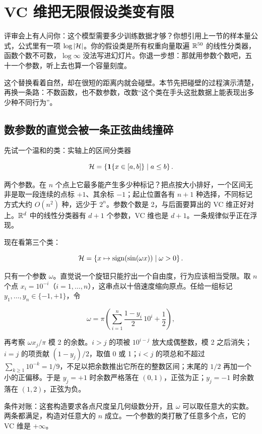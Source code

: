 \section{VC 维把无限假设类变有限}
\label{sec:13-Machine-Learning/10-Learning-Theory/03}

评审会上有人问你：这个模型需要多少训练数据才够？你想引用上一节的样本量公式，公式里有一项 \(\log\left|\mathcal{H}\right|\)。你的假设类是所有权重向量取遍 \(\mathbb{R}^{50}\) 的线性分类器，函数个数不可数，\(\log\infty\) 没法写进幻灯片。你退一步想：那就用参数个数吧，五十一个参数，听上去也算一个容量刻度。

这个替换看着自然，却在很短的距离内就会碰壁。本节先把碰壁的过程演示清楚，再换一条路：不数函数，也不数参数，改数``这个类在手头这批数据上能表现出多少种不同行为''。

\subsection{数参数的直觉会被一条正弦曲线撞碎}

先试一个温和的类：实轴上的区间分类器

\[
\mathcal{H}=\left\{\mathbf{1}\{x\in[a,b]\} \mid a\le b\right\}.
\]

两个参数。在 \(n\) 个点上它最多能产生多少种标记？把点按大小排好，一个区间无非是取一段连续的点标 \(+1\)、其余标 \(-1\)；起止位置各有 \(n+1\) 种选择，不同标记方式大约 \(O(n^2)\) 种，远少于 \(2^n\)。参数个数是 2，与后面要算出的 VC 维正好对上。\(\mathbb{R}^d\) 中的线性分类器有 \(d+1\) 个参数，VC 维也是 \(d+1\)。一条规律似乎正在浮现。

现在看第三个类：

\[
\mathcal{H}=\left\{x\mapsto \operatorname{sign}(\sin(\omega x)) \mid \omega>0\right\}.
\]

只有一个参数 \(\omega\)。直觉说一个旋钮只能拧出一个自由度，行为应该相当受限。取 \(n\) 个点 \(x_i=10^{-i}\)（\(i=1,\dots,n\)），这串点以十倍速度缩向原点。任给一组标记 \(y_1,\dots,y_n\in\{-1,+1\}\)，令

\[
\omega = \pi\left(\sum_{i=1}^n \frac{1-y_i}{2}\,10^i + \frac12\right),
\]

再考察 \(\omega x_j/\pi\) 模 2 的余数。\(i>j\) 的项被 \(10^{i-j}\) 放大成偶整数，模 2 之后消失；\(i=j\) 的项贡献 \((1-y_j)/2\)，取值 0 或 1；\(i<j\) 的项总和不超过 \(\sum_{k\ge 1}10^{-k}=1/9\)，不足以把余数推出它所在的整数区间；末尾的 \(1/2\) 再加一个小的正偏移。于是 \(y_j=+1\) 时余数严格落在 \((0,1)\)，正弦为正；\(y_j=-1\) 时余数落在 \((1,2)\)，正弦为负。

条件对账：这套构造要求各点尺度呈几何级数分开，且 \(\omega\) 可以取任意大的实数。两条都满足，构造对任意大的 \(n\) 成立。一个参数的类打散了任意多个点，它的 VC 维是 \(+\infty\)。

